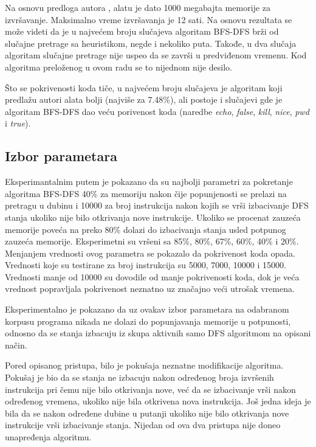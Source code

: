 \documentclass[12pt,oneside]{memoir}
\begin{document}
Na osnovu predloga autora \cite{klee}, alatu je dato 1000 megabajta memorije za izvršavanje. Maksimalno vreme izvršavanja je 12 sati. Na osnovu rezultata se može videti da je u najvećem broju slučajeva algoritam BFS-DFS brži od slučajne pretrage sa heuristikom, negde i nekoliko puta. Takođe, u dva slučaja algoritam slučajne pretrage nije uspeo da se završi u predviđenom vremenu. Kod algoritma preloženog u ovom radu se to nijednom nije desilo. 

Što se pokrivenosti koda tiče, u najvećem broju slučajeva je algoritam koji predlažu autori alata bolji (najviše za 7.48\%), ali postoje i slučajevi gde je algoritam BFS-DFS dao veću porivenost koda (naredbe \textit{echo}, \textit{false}, \textit{kill}, \textit{nice}, \textit{pwd} i \textit{true}).

\subsection{Izbor parametara}

Eksperimantalnim putem je pokazano da su najbolji parametri za pokretanje algoritma BFS-DFS 40\% za memoriju nakon čije popunjenosti se prelazi na pretragu u dubinu i 10000 za broj instrukcija nakon kojih se vrši izbacivanje DFS stanja ukoliko nije bilo otkrivanja nove instrukcije. Ukoliko se procenat zauzeća memorije poveća na preko 80\% dolazi do izbacivanja stanja usled potpunog zauzeća memorije. Eksperimetni su vršeni sa 85\%, 80\%, 67\%, 60\%, 40\% i 20\%. Menjanjem vrednosti ovog parametra se pokazalo da pokrivenost koda opada. Vrednosti koje su testirane za broj instrukcija su 5000, 7000, 10000 i 15000. Vrednosti manje od 10000 su dovodile od manje pokrivenosti koda, dok je veća vrednost popravljala pokrivenost neznatno uz značajno veći utrošak vremena.

Eksperimentalno je pokazano da uz ovakav izbor parametara na odabranom korpusu programa nikada ne dolazi do popunjavanja memorije u potpunosti, odnosno da se stanja izbacuju iz skupa aktivnih samo DFS algoritmom na opisani način.

Pored opisanog pristupa, bilo je pokušaja neznatne modifikacije algoritma. Pokušaj je bio da se stanja ne izbacuju nakon određenog broja izvršenih instrukcija pri čemu nije bilo otkrivanja nove, već da se izbacivanje vrši nakon određenog vremena, ukoliko nije bila otkrivena nova instrukcija. Još jedna ideja je bila da se nakon određene dubine u putanji ukoliko nije bilo otkrivanja nove instrukcije vrši izbacivanje stanja. Nijedan od ova dva pristupa nije doneo unapređenja algoritmu.
\end{document}
